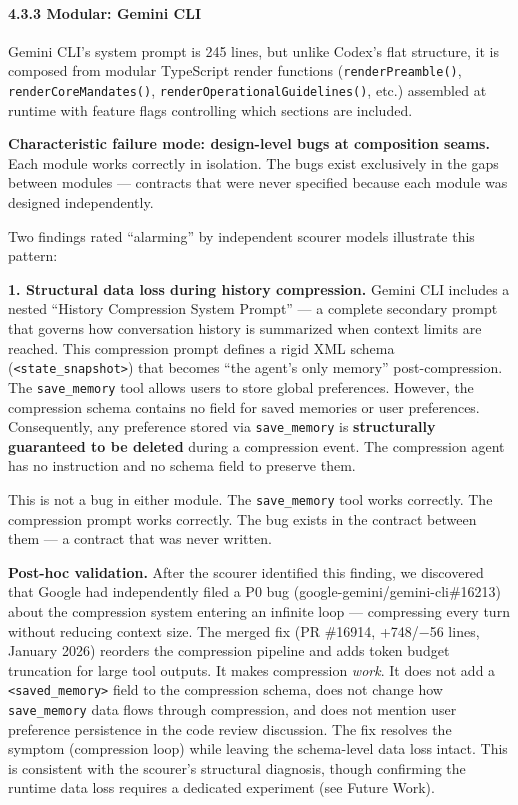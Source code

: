 \documentclass[
]{article}
\begin{document}
\hypertarget{modular-gemini-cli}{%
\paragraph{4.3.3 Modular: Gemini CLI}\label{modular-gemini-cli}}

Gemini CLI's system prompt is 245 lines, but unlike Codex's flat
structure, it is composed from modular TypeScript render functions
(\texttt{renderPreamble()}, \texttt{renderCoreMandates()},
\texttt{renderOperationalGuidelines()}, etc.) assembled at runtime with
feature flags controlling which sections are included.

\textbf{Characteristic failure mode: design-level bugs at composition
seams.} Each module works correctly in isolation. The bugs exist
exclusively in the gaps between modules --- contracts that were never
specified because each module was designed independently.

Two findings rated ``alarming'' by independent scourer models illustrate
this pattern:

\textbf{1. Structural data loss during history compression.} Gemini CLI
includes a nested ``History Compression System Prompt'' --- a complete
secondary prompt that governs how conversation history is summarized
when context limits are reached. This compression prompt defines a rigid
XML schema (\texttt{\textless{}state\_snapshot\textgreater{}}) that
becomes ``the agent's only memory'' post-compression. The
\texttt{save\_memory} tool allows users to store global preferences.
However, the compression schema contains no field for saved memories or
user preferences. Consequently, any preference stored via
\texttt{save\_memory} is \textbf{structurally guaranteed to be deleted}
during a compression event. The compression agent has no instruction and
no schema field to preserve them.

This is not a bug in either module. The \texttt{save\_memory} tool works
correctly. The compression prompt works correctly. The bug exists in the
contract between them --- a contract that was never written.

\textbf{Post-hoc validation.} After the scourer identified this finding,
we discovered that Google had independently filed a P0 bug
(google-gemini/gemini-cli\#16213) about the compression system entering
an infinite loop --- compressing every turn without reducing context
size. The merged fix (PR \#16914, +748/−56 lines, January 2026) reorders
the compression pipeline and adds token budget truncation for large tool
outputs. It makes compression \emph{work}. It does not add a
\texttt{\textless{}saved\_memory\textgreater{}} field to the compression
schema, does not change how \texttt{save\_memory} data flows through
compression, and does not mention user preference persistence in the
code review discussion. The fix resolves the symptom (compression loop)
while leaving the schema-level data loss intact. This is consistent with
the scourer's structural diagnosis, though confirming the runtime data
loss requires a dedicated experiment (see Future Work).
\end{document}
